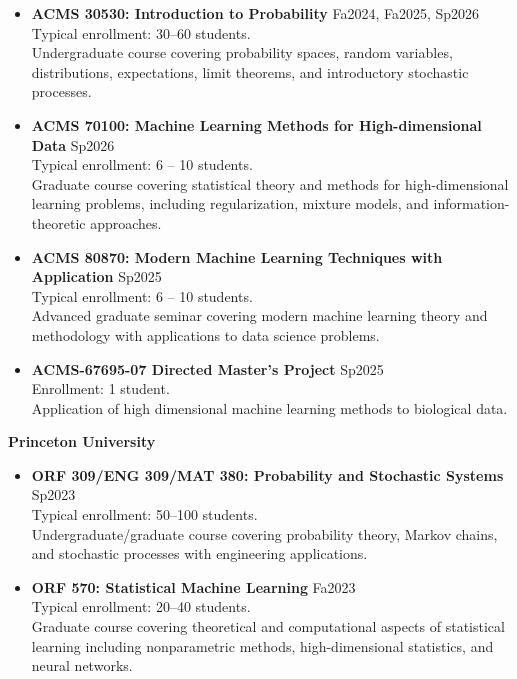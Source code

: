 \documentclass[letterpaper,oneside]{article}
\begin{document}
\begin{itemize}[leftmargin=0pt, label={}]
  \item \textbf{ACMS 30530: Introduction to Probability} \hfill Fa2024, Fa2025, Sp2026\\
  Typical enrollment: 30--60 students.\\
  Undergraduate course covering probability spaces, random variables, distributions, expectations, limit theorems, and introductory stochastic processes.

  \item \textbf{ACMS 70100: Machine Learning Methods for High-dimensional Data} \hfill Sp2026\\
  Typical enrollment: 6 -- 10 students.\\
  Graduate course covering statistical theory and methods for high-dimensional learning problems, including regularization, mixture models, and information-theoretic approaches.

  \item \textbf{ACMS 80870: Modern Machine Learning Techniques with Application} \hfill Sp2025\\
  Typical enrollment: 6 -- 10 students.\\
  Advanced graduate seminar covering modern machine learning theory and methodology with applications to data science problems.
  
  \item \textbf{ACMS-67695-07 Directed Master's Project} \hfill Sp2025\\
  Enrollment: 1 student.\\
  Application of high dimensional machine learning methods to biological data.
\end{itemize}

\noindent\textbf{Princeton University}

\begin{itemize}[leftmargin=0pt, label={}]
  \item \textbf{ORF 309/ENG 309/MAT 380: Probability and Stochastic Systems} \hfill Sp2023\\
  Typical enrollment: 50--100 students.\\
  Undergraduate/graduate course covering probability theory, Markov chains, and stochastic processes with engineering applications.

  \item \textbf{ORF 570: Statistical Machine Learning} \hfill Fa2023\\
  Typical enrollment: 20--40 students.\\
  Graduate course covering theoretical and computational aspects of statistical learning including nonparametric methods, high-dimensional statistics, and neural networks.
\end{itemize}
%
%
\end{document}
